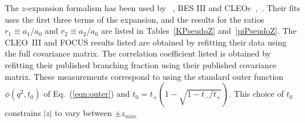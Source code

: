 \begin{table}[htbp]
\begin{center}
\begin{tabular}{cccc}
\vspace*{-10pt} & \\
\hline
\end{tabular}
\end{center}
\end{table}

The $z$-expansion formalism has been used by \babar~\cite{Aubert:2007wg,Lees:2014jka}, 
BES III\cite{BESIII-new} and CLEOc~\cite{Besson:2009uv},~\cite{Dobbs:2007aa}.
Their fits uses the first three terms of the expansion, %
and the results for the ratios $r_1\equiv a_1/a_0$ and $r_2\equiv a_2/a_0$ are 
listed in Tables~\ref{KPseudoZ} and~\ref{piPseudoZ}. 
The CLEO~III\cite{Huang:2004fra} and FOCUS\cite{Link:2004dh} results 
listed are obtained by refitting their data using the full
covariance matrix. The \babar correlation coefficient listed is 
obtained by refitting their published branching fraction using 
their published covariance matrix.  
These measurements correspond to using the standard 
outer function $\phi(q^2,t_0)$ of Eq.~(\ref{eqn:outer}) and 
$t_0=t_+\left(1-\sqrt{1-t_-/t_+}\right)$. This choice of $t^{}_0$
constrains $|z|$ to vary between $\pm z_{max.}$


